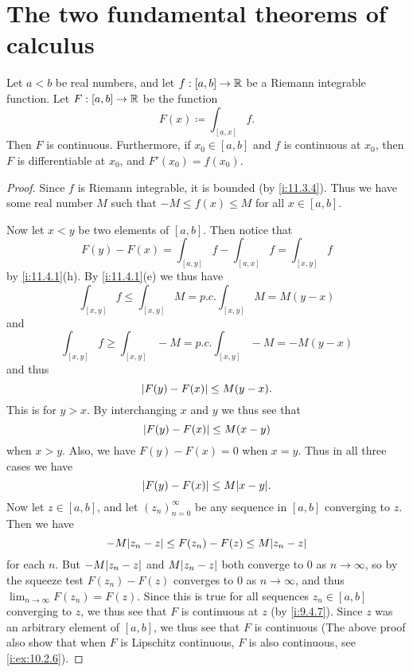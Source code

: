 \section{The two fundamental theorems of calculus}\label{i:sec:11.9}

\begin{thm}\label{i:11.9.1}
  Let \(a < b\) be real numbers, and let \(f : [a, b] \to \mathbb{R}\) be a Riemann integrable function.
  Let \(F : [a, b] \to \mathbb{R}\) be the function
  \[
    F(x) \coloneqq \int_{[a, x]} f.
  \]
  Then \(F\) is continuous.
  Furthermore, if \(x_0 \in [a, b]\) and \(f\) is continuous at \(x_0\), then \(F\) is differentiable at \(x_0\), and \(F'(x_0) = f(x_0)\).
\end{thm}

\begin{proof}
  Since \(f\) is Riemann integrable, it is bounded (by \cref{i:11.3.4}).
  Thus we have some real number \(M\) such that \(-M \leq f(x) \leq M\) for all \(x \in [a, b]\).

  Now let \(x < y\) be two elements of \([a, b]\).
  Then notice that
  \[
    F(y) - F(x) = \int_{[a, y]} f - \int_{[a, x]} f = \int_{[x, y]} f
  \]
  by \cref{i:11.4.1}(h).
  By \cref{i:11.4.1}(e) we thus have
  \[
    \int_{[x, y]} f \leq \int_{[x, y]} M = p.c. \int_{[x, y]} M = M(y - x)
  \]
  and
  \[
    \int_{[x, y]} f \geq \int_{[x, y]} -M = p.c. \int_{[x, y]} -M = -M(y - x)
  \]
  and thus
  \[
    \left\lvert F(y) - F(x)\right\rvert \leq M(y - x).
  \]
  This is for \(y > x\).
  By interchanging \(x\) and \(y\) we thus see that
  \[
    \left\lvert F(y) - F(x)\right\rvert \leq M(x - y)
  \]
  when \(x > y\).
  Also, we have \(F(y) - F(x) = 0\) when \(x = y\).
  Thus in all
  three cases we have
  \[
    \abs{F(y) - F(x)} \leq M \abs{x - y}.
  \]
  Now let \(z \in [a, b]\), and let \((z_n)_{n = 0}^\infty\) be any sequence in \([a, b]\) converging to \(z\).
  Then we have
  \[
    -M \abs{z_n - z} \leq F(z_n) - F(z) \leq M \abs{z_n - z}
  \]
  for each \(n\).
  But \(-M \abs{z_n - z}\) and \(M \abs{z_n - z}\) both converge to \(0\) as \(n \to \infty\), so by the squeeze test \(F(z_n) - F(z)\) converges to \(0\) as \(n \to \infty\), and thus \(\lim_{n \to \infty} F(z_n) = F(z)\).
  Since this is true for all sequences \(z_n \in [a, b]\) converging to \(z\), we thus see that \(F\) is continuous at \(z\) (by \cref{i:9.4.7}).
  Since \(z\) was an arbitrary element of \([a, b]\), we thus see that \(F\) is continuous
  (The above proof also show that when \(F\) is Lipschitz continuous, \(F\) is also continuous, see \cref{i:ex:10.2.6}).


\end{proof}
